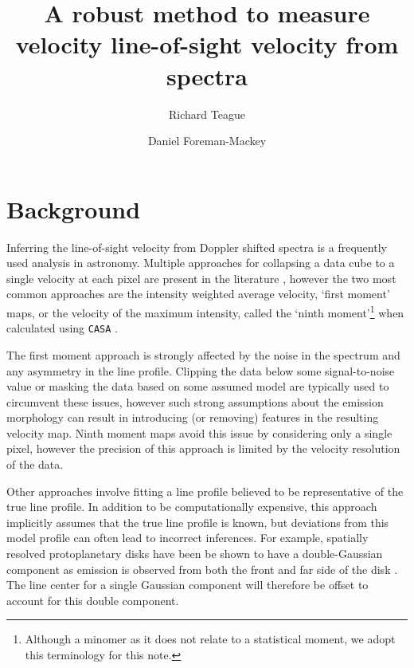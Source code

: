 \documentclass[rnaas]{aastex62}
\begin{document}
\raggedbottom\sloppy\sloppypar\frenchspacing

\title{%
A robust method to measure velocity line-of-sight velocity from spectra
}

\author[0000-0003-1534-5186]{Richard Teague}

\author[0000-0002-9328-5652]{Daniel Foreman-Mackey}


\section{Background}

Inferring the line-of-sight velocity from Doppler shifted spectra is a frequently used analysis in astronomy. Multiple approaches for collapsing a data cube to a single velocity at each pixel are present in the literature \citep[see, for example][]{deBlok:2008}, however the two most common approaches are the intensity weighted average velocity, `first moment' maps, or the velocity of the maximum intensity, called the `ninth moment'\footnote{Although a minomer as it does not relate to a statistical moment, we adopt this terminology for this note.} when calculated using \texttt{CASA} \citep{McMullin:2007}.

The first moment approach is strongly affected by the noise in the spectrum and any asymmetry in the line profile. Clipping the data below some signal-to-noise value or masking the data based on some assumed model are typically used to circumvent these issues, however such strong assumptions about the emission morphology can result in introducing (or removing) features in the resulting velocity map. Ninth moment maps avoid this issue by considering only a single pixel, however the precision of this approach is limited by the velocity resolution of the data.

Other approaches involve fitting a line profile believed to be representative of the true line profile. In addition to be computationally expensive, this approach implicitly assumes that the true line profile is known, but deviations from this model profile can often lead to incorrect inferences. For example, spatially resolved protoplanetary disks have been be shown to have a double-Gaussian component as emission is observed from both the front and far side of the disk \citep{Rosenfeld:2013}. The line center for a single Gaussian component will therefore be offset to account for this double component.
\end{document}

